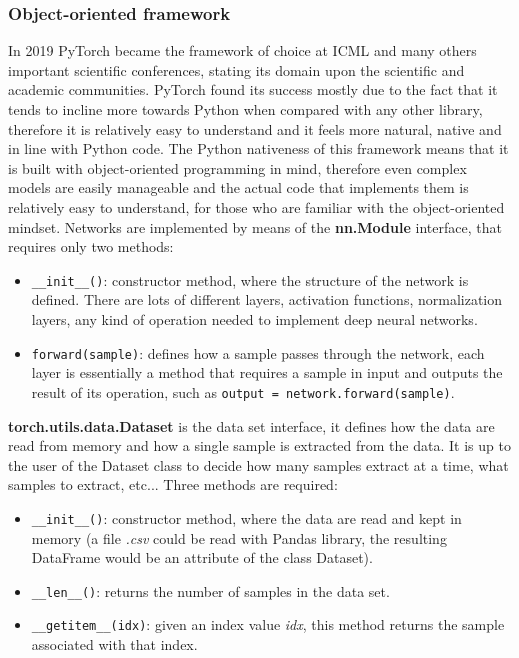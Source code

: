 \documentclass[11pt,a4paper,titlepage]{book}
\begin{document}
\subsubsection{Object-oriented framework}
In 2019 PyTorch became the framework of choice at ICML \cite{icml} and many others important scientific conferences, stating its domain upon the scientific and academic communities.
\newline
\newline
PyTorch found its success mostly due to the fact that it tends to incline more towards Python when compared with any other library, therefore it is relatively easy to understand and it feels more natural, native and in line with Python code.
\newline
The Python nativeness of this framework means that it is built with object-oriented programming in mind, therefore even complex models are easily manageable and the actual code that implements them is relatively easy to understand, for those who are familiar with the object-oriented mindset.
\newline
\newline
Networks are implemented by means of the \textbf{nn.Module} interface, that requires only two methods:
\begin{itemize}
    \item \texttt{\_\_init\_\_()}: constructor method, where the structure of the network is defined. There are lots of different layers, activation functions, normalization layers, any kind of operation needed to implement deep neural networks.
    \item \texttt{forward(sample)}: defines how a sample passes through the network, each layer is essentially a method that requires a sample in input and outputs the result of its operation, such as \texttt{output = network.forward(sample)}.
\end{itemize}
\textbf{torch.utils.data.Dataset} is the data set interface, it defines how the data are read from memory and how a single sample is extracted from the data. It is up to the user of the Dataset class to decide how many samples extract at a time, what samples to extract, etc...
\newline 
Three methods are required:
\begin{itemize}
    \item \texttt{\_\_init\_\_()}: constructor method, where the data are read and kept in memory (a file \textit{.csv} could be read with Pandas library, the resulting DataFrame would be an attribute of the class Dataset).
    \item \texttt{\_\_len\_\_()}: returns the number of samples in the data set.
    \item \texttt{\_\_getitem\_\_(idx)}: given an index value \textit{idx}, this method returns the sample associated with that index. 
\end{itemize}
\end{document}
